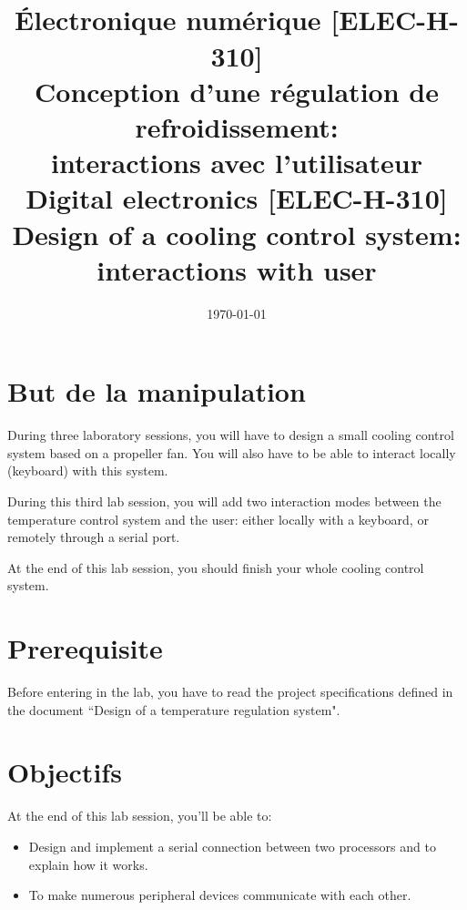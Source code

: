 \documentclass[11pt,a4paper]{article}
\date{\vspace{-1.7cm}\mydate\today}
\title{\vspace{-2cm}\labonumber\\ Électronique numérique [ELEC-H-310]\\Conception d'une régulation de refroidissement: \\ interactions avec l'utilisateur\ifthenelse{\boolean{corrige}}{~\\Corrigé}{}}
\title{\vspace{-2cm}\labonumber \\ Digital electronics [ELEC-H-310]\\Design of a cooling control system: \\ interactions with user\ifthenelse{\boolean{corrige}}{~\\Corrigé}{}}
\theoremstyle{definition}%
\begin{document}
\pagestyle{empty}
\maketitle





\section*{But de la manipulation}
During three laboratory sessions, you will have to design a small cooling control system based on a propeller fan.
You will also have to be able to interact locally (keyboard) with this system.

During this third lab session, you will add two interaction modes between the temperature control system and the user: either locally with a keyboard, or remotely through a serial port.

At the end of this lab session, you should finish your whole cooling control system.


\section*{Prerequisite}
Before entering in the lab, you have to read the project specifications defined in the document ``Design of a temperature regulation system".



\section*{Objectifs}
At the end of this lab session, you'll be able to:
\begin{itemize}
	\item Design and implement a serial connection between two processors and to explain how it works.
	\item To make numerous peripheral devices communicate with each other.
\end{itemize}


\newpage





\end{document}
